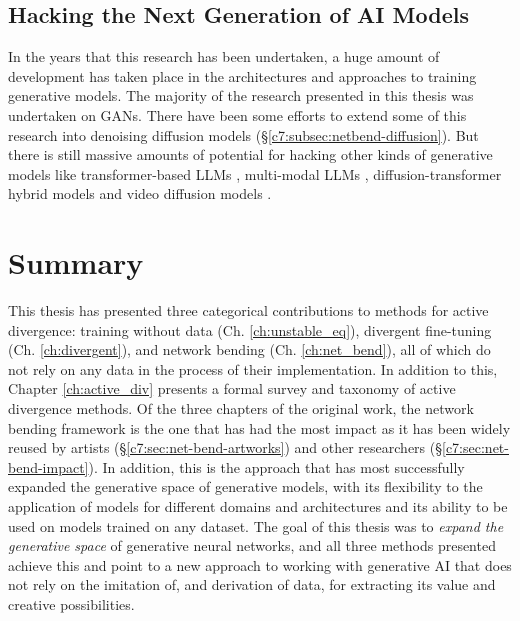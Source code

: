 \subsection{Hacking the Next Generation of AI Models}

In the years that this research has been undertaken, a huge amount of development has taken place in the architectures and approaches to training generative models.
The majority of the research presented in this thesis was undertaken on GANs.
There have been some efforts to extend some of this research into denoising diffusion models \citep{dzwonczyk2024network} (\S \ref{c7:subsec:netbend-diffusion}). 
But there is still massive amounts of potential for hacking other kinds of generative models like transformer-based LLMs \citep{vaswani2017attention}, multi-modal LLMs \citep{zhang2024mm}, diffusion-transformer hybrid models \citep{peebles2023scalable} and video diffusion models \citep{ho2022video}.

\section{Summary}

This thesis has presented three categorical contributions to methods for active divergence: training without data (Ch. \ref{ch:unstable_eq}), divergent fine-tuning (Ch. \ref{ch:divergent}), and network bending (Ch. \ref{ch:net_bend}), all of which do not rely on any data in the process of their implementation. 
In addition to this, Chapter \ref{ch:active_div} presents a formal survey and taxonomy of active divergence methods.
Of the three chapters of the original work, the network bending framework is the one that has had the most impact as it has been widely reused by artists (\S \ref{c7:sec:net-bend-artworks}) and other researchers (\S \ref{c7:sec:net-bend-impact}). 
In addition, this is the approach that has most successfully expanded the generative space of generative models, with its flexibility to the application of models for different domains and architectures and its ability to be used on models trained on any dataset.
The goal of this thesis was to \textit{expand the generative space} of generative neural networks, and all three methods presented achieve this and point to a new approach to working with generative AI that does not rely on the imitation of, and derivation of data, for extracting its value and creative possibilities.
